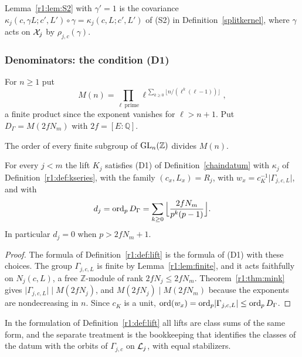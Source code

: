Lemma~\ref{r1:lem:S2} with $\gamma'=1$ is the covariance $\kappa_j(c,\gamma L;c',L')\circ\gamma=\kappa_j(c,L;c',L')$ of (S2) in Definition~\ref{splitkernel}, where $\gamma$ acts on $\mathcal X_j$ by $\rho_{j,c}(\gamma)$.

\subsubsection{Denominators: the condition (D1)}

\begin{definition}\label{r1:def:DGamma}
For $n\ge1$ put
\[
M(n)=\prod_{\ell\ \mathrm{prime}}\ell^{\,\sum_{k\ge0}\lfloor n/(\ell^k(\ell-1))\rfloor},
\]
a finite product since the exponent vanishes for $\ell>n+1$. Put $D_\Gamma=M(2fN_m)$ with $2f=[E:\mathbb Q]$.
\end{definition}

\begin{theorem}[Minkowski]\label{r1:thm:mink}
The order of every finite subgroup of $\operatorname{GL}_n(\mathbb Z)$ divides $M(n)$.
\end{theorem}

\begin{proposition}\label{r1:prop:D1}
For every $j<m$ the lift $K_j$ satisfies (D1) of Definition~\ref{chaindatum} with $\kappa_j$ of Definition~\ref{r1:def:kseries}, with the family $(c_x,L_x)=R_j$, with $w_x=c_K^{-1}\lvert\Gamma_{j,c,L}\rvert$, and with
\[
d_j=\operatorname{ord}_p D_\Gamma=\sum_{k\ge0}\Big\lfloor\frac{2fN_m}{p^k(p-1)}\Big\rfloor .
\]
In particular $d_j=0$ when $p>2fN_m+1$.
\end{proposition}

\begin{proof}
The formula of Definition~\ref{r1:def:lift} is the formula of (D1) with these choices. The group $\Gamma_{j,c,L}$ is finite by Lemma~\ref{r1:lem:finite}, and it acts faithfully on $N_j(c,L)$, a free $\mathbb Z$-module of rank $2fN_j\le2fN_m$. Theorem~\ref{r1:thm:mink} gives $\lvert\Gamma_{j,c,L}\rvert\mid M(2fN_j)$, and $M(2fN_j)\mid M(2fN_m)$ because the exponents are nondecreasing in $n$. Since $c_K$ is a unit, $\operatorname{ord}(w_x)=\operatorname{ord}_p\lvert\Gamma_{j,c,L}\rvert\le\operatorname{ord}_pD_\Gamma$.
\end{proof}

\begin{remark}
In the formulation of Definition~\ref{r1:def:lift} all lifts are class sums of the same form, and the separate treatment is the bookkeeping that identifies the classes of the datum with the orbits of $\Gamma_{j,c}$ on $\mathcal L_j$, with equal stabilizers.
\end{remark}

